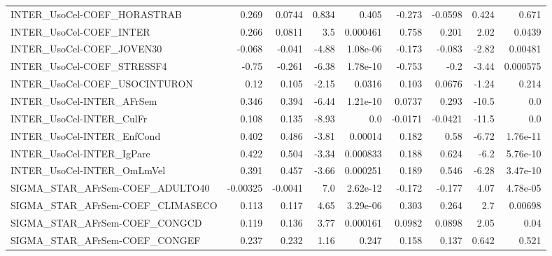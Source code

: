 \begin{tabular}{lrrrrrrrr}
INTER\_UsoCel-COEF\_HORASTRAB           &       0.269 &       0.0744 &   0.834 &    0.405 &     -0.273 &     -0.0598 &        0.424 &         0.671 \\
INTER\_UsoCel-COEF\_INTER               &       0.266 &       0.0811 &     3.5 & 0.000461 &      0.758 &       0.201 &         2.02 &        0.0439 \\
INTER\_UsoCel-COEF\_JOVEN30             &      -0.068 &       -0.041 &   -4.88 & 1.08e-06 &     -0.173 &      -0.083 &        -2.82 &       0.00481 \\
INTER\_UsoCel-COEF\_STRESSF4            &       -0.75 &       -0.261 &   -6.38 & 1.78e-10 &     -0.753 &        -0.2 &        -3.44 &      0.000575 \\
INTER\_UsoCel-COEF\_USOCINTURON         &        0.12 &        0.105 &   -2.15 &   0.0316 &      0.103 &      0.0676 &        -1.24 &         0.214 \\
INTER\_UsoCel-INTER\_AFrSem             &       0.346 &        0.394 &   -6.44 & 1.21e-10 &     0.0737 &       0.293 &        -10.5 &           0.0 \\
INTER\_UsoCel-INTER\_CulFr              &       0.108 &        0.135 &   -8.93 &      0.0 &    -0.0171 &     -0.0421 &        -11.5 &           0.0 \\
INTER\_UsoCel-INTER\_EnfCond            &       0.402 &        0.486 &   -3.81 &  0.00014 &      0.182 &        0.58 &        -6.72 &      1.76e-11 \\
INTER\_UsoCel-INTER\_IgPare             &       0.422 &        0.504 &   -3.34 & 0.000833 &      0.188 &       0.624 &         -6.2 &      5.76e-10 \\
INTER\_UsoCel-INTER\_OmLmVel            &       0.391 &        0.457 &   -3.66 & 0.000251 &      0.189 &       0.546 &        -6.28 &      3.47e-10 \\
SIGMA\_STAR\_AFrSem-COEF\_ADULTO40       &    -0.00325 &      -0.0041 &     7.0 & 2.62e-12 &     -0.172 &      -0.177 &         4.07 &      4.78e-05 \\
SIGMA\_STAR\_AFrSem-COEF\_CLIMASECO      &       0.113 &        0.117 &    4.65 & 3.29e-06 &      0.303 &       0.264 &          2.7 &       0.00698 \\
SIGMA\_STAR\_AFrSem-COEF\_CONGCD         &       0.119 &        0.136 &    3.77 & 0.000161 &     0.0982 &      0.0898 &         2.05 &          0.04 \\
SIGMA\_STAR\_AFrSem-COEF\_CONGEF         &       0.237 &        0.232 &    1.16 &    0.247 &      0.158 &       0.137 &        0.642 &         0.521 \\

\end{tabular}
